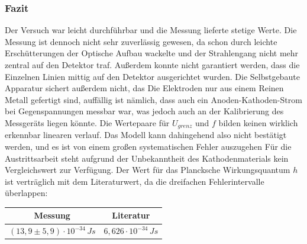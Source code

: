 \subsubsection{Fazit}
Der Versuch war leicht durchführbar und die Messung lieferte stetige Werte. Die Messung ist dennoch nicht sehr zuverlässig gewesen, da schon durch leichte Erschütterungen der Optische Aufbau wackelte und der Strahlengang nicht mehr zentral auf den Detektor traf. Außerdem konnte nicht garantiert werden, dass die Einzelnen Linien mittig auf den Detektor ausgerichtet wurden. Die Selbstgebaute Apparatur sichert außerdem nicht, das Die Elektroden nur aus einem Reinen Metall gefertigt sind, auffällig ist nämlich, dass auch ein Anoden-Kathoden-Strom bei Gegenspannungen messbar war, was jedoch auch an der Kalibrierung des Messgeräts liegen könnte. Die Wertepaare für \(U_{grenz}\) und \(f\) bilden keinen wirklich erkennbar linearen verlauf. Das Modell kann dahingehend also nicht bestätigt werden, und es ist von einem großen systematischen Fehler auszugehen Für die Austrittsarbeit steht aufgrund der Unbekanntheit des Kathodenmaterials kein Vergleichswert zur Verfügung. Der Wert für das Plancksche Wirkungsquantum \(h\) ist verträglich mit dem Literaturwert, da die dreifachen Fehlerintervalle überlappen:
\begin{center}
\begin{tabular}{c|c}
Messung & Literatur \\\hline
\((13,9 \pm 5,9)\cdot 10^{-34} \,Js \) & \( 6,626 \cdot 10^{-34}\, Js\)
\end{tabular}
\end{center}